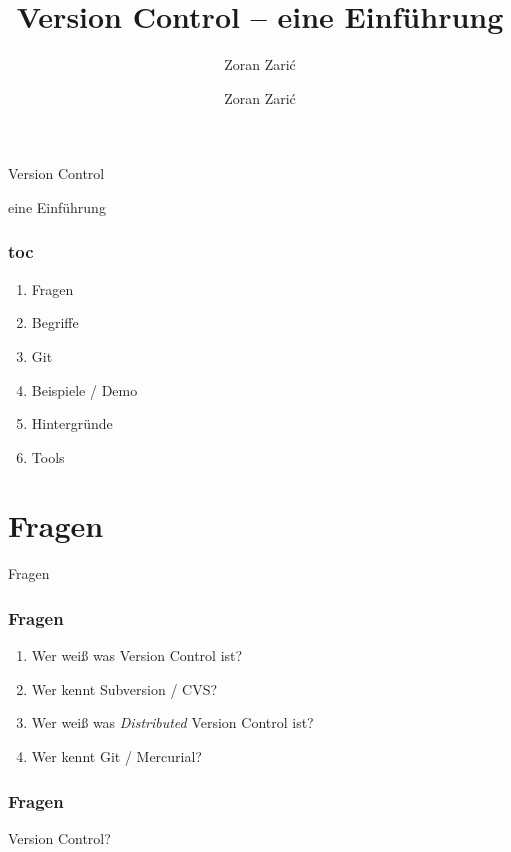 \documentclass[]{beamer}
\begin{document}

\title[Version Control]{Version Control -- eine Einführung}
\subtitle[Zoran Zari\'c]{Zoran Zari\'c}
\author[Zoran Zari\'c]{Zoran Zari\'c}

\begin{frame}
	\fontsize{30}{10}\selectfont Version Control
	\vspace*{0.5cm}

	\fontsize{20}{10}\selectfont eine Einführung
	\only<2>{
		(Ja, mit Git)
	}
\end{frame}

\begin{frame}
	\frametitle{toc}
	\begin{enumerate}
		\item
			Fragen
		\item
			Begriffe
		\item
			Git
		\item
			Beispiele / Demo
		\item
			Hintergründe
		\item
			Tools
	\end{enumerate}
\end{frame}

\section{Fragen}
\begin{frame}
	\fontsize{30}{10}\selectfont Fragen
\end{frame}

\begin{frame}
	\frametitle{Fragen}
	\begin{enumerate}
		\item<1->
			Wer weiß was Version Control ist?
		\item<2->
			Wer kennt Subversion / CVS?
		\item<3->
			Wer weiß was \emph{Distributed} Version Control ist?
		\item<4->
			Wer kennt Git / Mercurial?

	\end{enumerate}
\end{frame}

\begin{frame}
	\frametitle{Fragen}
	\Huge{Version Control?}\\
\end{frame}
\end{document}
